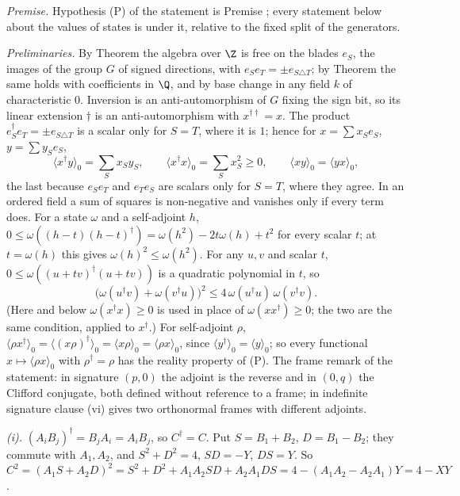 \emph{Premise.} Hypothesis (P) of the statement is Premise ; every statement below about the values of states is under it, relative to the fixed split of the generators.

\emph{Preliminaries.} By Theorem  the algebra over $\Z$ is free on the blades $e_{S}$, the images of the group $G$ of signed directions, with $e_{S}e_{T} = \pm e_{S \triangle T}$; by Theorem  the same holds with coefficients in $\Q$, and by base change in any field $k$ of characteristic $0$. Inversion is an anti-automorphism of $G$ fixing the sign bit, so its linear extension $\dagger$ is an anti-automorphism with $x^{\dagger\dagger} = x$. The product $e_{S}^{\dagger}e_{T} = \pm e_{S \triangle T}$ is a scalar only for $S = T$, where it is $1$; hence for $x = \sum x_{S}e_{S}$, $y = \sum y_{S}e_{S}$,
\[
\langle x^{\dagger}y\rangle_{0} = \sum_{S}x_{S}y_{S}, \qquad \langle x^{\dagger}x\rangle_{0} = \sum_{S}x_{S}^{2} \ge 0, \qquad \langle xy\rangle_{0} = \langle yx\rangle_{0},
\]
the last because $e_{S}e_{T}$ and $e_{T}e_{S}$ are scalars only for $S = T$, where they agree. In an ordered field a sum of squares is non-negative and vanishes only if every term does. For a state $\omega$ and a self-adjoint $h$, $0 \le \omega((h - t)(h - t)^{\dagger}) = \omega(h^{2}) - 2t\omega(h) + t^{2}$ for every scalar $t$; at $t = \omega(h)$ this gives $\omega(h)^{2} \le \omega(h^{2})$. For any $u, v$ and scalar $t$, $0 \le \omega((u + tv)^{\dagger}(u + tv))$ is a quadratic polynomial in $t$, so
\[
\bigl(\omega(u^{\dagger}v) + \omega(v^{\dagger}u)\bigr)^{2} \le 4\,\omega(u^{\dagger}u)\,\omega(v^{\dagger}v). \tag{CS}
\]
(Here and below $\omega(x^{\dagger}x) \ge 0$ is used in place of $\omega(xx^{\dagger}) \ge 0$; the two are the same condition, applied to $x^{\dagger}$.) For self-adjoint $\rho$, $\langle\rho x^{\dagger}\rangle_{0} = \langle(x\rho)^{\dagger}\rangle_{0} = \langle x\rho\rangle_{0} = \langle\rho x\rangle_{0}$, since $\langle y^{\dagger}\rangle_{0} = \langle y\rangle_{0}$; so every functional $x \mapsto \langle\rho x\rangle_{0}$ with $\rho^{\dagger} = \rho$ has the reality property of (P). The frame remark of the statement: in signature $(p,0)$ the adjoint is the reverse and in $(0,q)$ the Clifford conjugate, both defined without reference to a frame; in indefinite signature clause (vi) gives two orthonormal frames with different adjoints.

\emph{(i).} $(A_{i}B_{j})^{\dagger} = B_{j}A_{i} = A_{i}B_{j}$, so $C^{\dagger} = C$. Put $S = B_{1} + B_{2}$, $D = B_{1} - B_{2}$; they commute with $A_{1}, A_{2}$, and $S^{2} + D^{2} = 4$, $SD = -Y$, $DS = Y$. So $C^{2} = (A_{1}S + A_{2}D)^{2} = S^{2} + D^{2} + A_{1}A_{2}SD + A_{2}A_{1}DS = 4 - (A_{1}A_{2} - A_{2}A_{1})Y = 4 - XY$.

